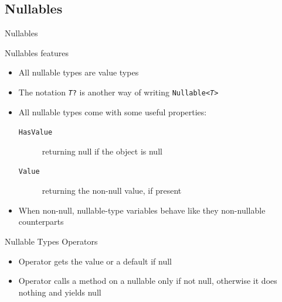 \documentclass[presentation]{beamer}
\begin{document}
\subsection{Nullables}

\begin{frame}[shrink=5]{\dotnet Nullables}
    \begin{block}{Nullables features}
        \begin{itemize}
            \item All nullable types are \alert{value} types

            \item The notation \texttt{\textit{T}?} is another way of writing \texttt{Nullable<\textit{T}>}
            \item All nullable types come with some useful properties:
            \begin{description}
                \item[\texttt{HasValue}] returning null if the object is null
                \item[\texttt{Value}] returning the non-null value, if present
            \end{description}

            \item When non-null, nullable-type variables behave like they non-nullable counterparts
        \end{itemize}
    \end{block}
    
\end{frame}

\begin{frame}{Nullable Types Operators}
    \begin{block}{}
        \begin{itemize}
            \item Operator  gets the value or a default if null

            \item Operator  calls a method on a nullable only if not null, otherwise it does nothing and yields null
        \end{itemize}
    \end{block}

\end{frame}
\end{document}

